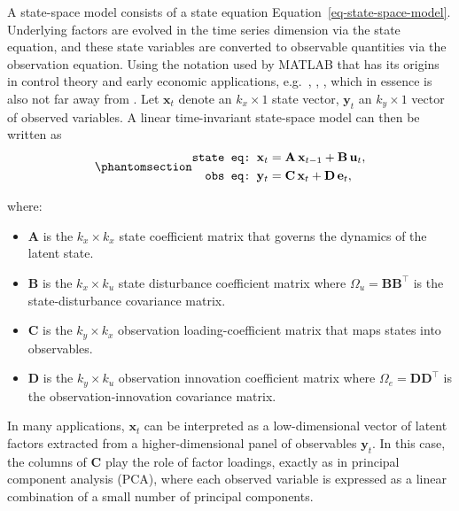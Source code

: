 \documentclass[
  letterpaper,
  DIV=11,
  numbers=noendperiod]{scrreprt}
\providecommand{\tightlist}{%
  \setlength{\itemsep}{0pt}\setlength{\parskip}{0pt}}
\begin{document}
A state-space model consists of a state equation
Equation~\ref{eq-state-space-model}. Underlying factors are evolved in
the time series dimension via the state equation, and these state
variables are converted to observable quantities via the observation
equation. Using the notation used by MATLAB that has its origins in
control theory and early economic applications, e.g.~, , , which in
essence is also not far away from . Let \(\mathbf{x}_t\) denote an
\(k_x \times 1\) state vector, \(\mathbf{y}_t\) an \(k_y \times 1\)
vector of observed variables. A linear time-invariant state-space model
can then be written as
\begin{equation}\protect\phantomsection\label{eq-state-space-model}{  
\begin{align}
   \texttt{state eq:} \, \, \, \mathbf{x}_{t} &= \mathbf{A}\,\mathbf{x}_{t-1} + \mathbf{B}\,\mathbf{u}_t, \\
   \texttt{obs eq:} \, \, \, \mathbf{y}_t &= \mathbf{C}\,\mathbf{x}_t + \mathbf{D}\,\mathbf{e}_t, 
\end{align}
}\end{equation}

where:

\begin{itemize}
\tightlist
\item
  \(\mathbf{A}\) is the \(k_x \times k_x\) state coefficient matrix that
  governs the dynamics of the latent state.
\item
  \(\mathbf{B}\) is the \(k_x \times k_u\) state disturbance coefficient
  matrix where \(\Omega_u=\mathbf{B}\mathbf{B}^{\top}\) is the
  state-disturbance covariance matrix.
\item
  \(\mathbf{C}\) is the \(k_y \times k_x\) observation
  loading-coefficient matrix that maps states into observables.
\item
  \(\mathbf{D}\) is the \(k_y \times k_u\) observation innovation
  coefficient matrix where \(\Omega_e=\mathbf{D}\mathbf{D}^{\top}\) is
  the observation-innovation covariance matrix.
\end{itemize}

In many applications, \(\mathbf{x}_t\) can be interpreted as a
low-dimensional vector of latent factors extracted from a
higher-dimensional panel of observables \(\mathbf{y}_t\). In this case,
the columns of \(\mathbf{C}\) play the role of factor loadings, exactly
as in principal component analysis (PCA), where each observed variable
is expressed as a linear combination of a small number of principal
components.
\end{document}
